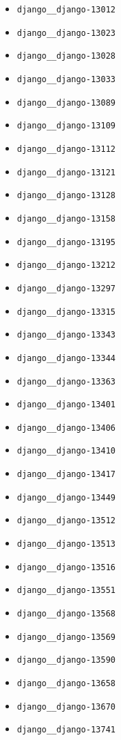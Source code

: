 \begin{multicols}{2}
\begin{itemize}
    \item \texttt{django\_\_django-13012}
    \item \texttt{django\_\_django-13023}
    \item \texttt{django\_\_django-13028}
    \item \texttt{django\_\_django-13033}
    \item \texttt{django\_\_django-13089}
    \item \texttt{django\_\_django-13109}
    \item \texttt{django\_\_django-13112}
    \item \texttt{django\_\_django-13121}
    \item \texttt{django\_\_django-13128}
    \item \texttt{django\_\_django-13158}
    \item \texttt{django\_\_django-13195}
    \item \texttt{django\_\_django-13212}
    \item \texttt{django\_\_django-13297}
    \item \texttt{django\_\_django-13315}
    \item \texttt{django\_\_django-13343}
    \item \texttt{django\_\_django-13344}
    \item \texttt{django\_\_django-13363}
    \item \texttt{django\_\_django-13401}
    \item \texttt{django\_\_django-13406}
    \item \texttt{django\_\_django-13410}
    \item \texttt{django\_\_django-13417}
    \item \texttt{django\_\_django-13449}
    \item \texttt{django\_\_django-13512}
    \item \texttt{django\_\_django-13513}
    \item \texttt{django\_\_django-13516}
    \item \texttt{django\_\_django-13551}
    \item \texttt{django\_\_django-13568}
    \item \texttt{django\_\_django-13569}
    \item \texttt{django\_\_django-13590}
    \item \texttt{django\_\_django-13658}
    \item \texttt{django\_\_django-13670}
    \item \texttt{django\_\_django-13741}

\end{itemize}
\end{multicols}
